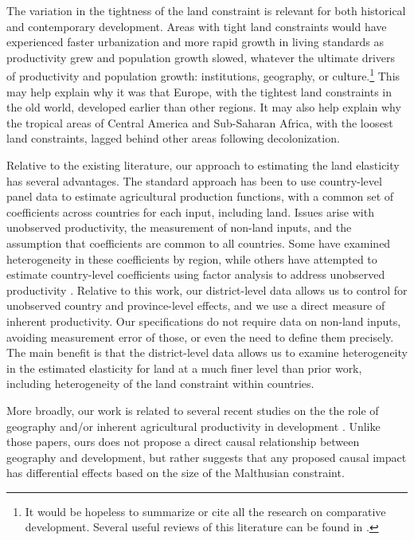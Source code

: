 \documentclass[11pt]{article}
\begin{document}
The variation in the tightness of the land constraint is relevant for both historical and contemporary development. Areas with tight land constraints would have experienced faster urbanization and more rapid growth in living standards as productivity grew and population growth slowed, whatever the ultimate drivers of productivity and population growth: institutions, geography, or culture.\footnote{It would be hopeless to summarize or cite all the research on comparative development. Several useful reviews of this literature can be found in \cite{ajr2005handbook,nunn_2009,Galor:2011uq,sw2013,vries2013}.} This may help explain why it was that Europe, with the tightest land constraints in the old world, developed earlier than other regions. It may also help explain why the tropical areas of Central America and Sub-Saharan Africa, with the loosest land constraints, lagged behind other areas following decolonization.

Relative to the existing literature, our approach to estimating the land elasticity has several advantages. The standard approach has been to use country-level panel data \citep{Hayami:1970ly,Hayami:1985cr,cpr1997,mm2001,Mundlak:2000dq,mbl2012,et2013mango} to estimate agricultural production functions, with a common set of coefficients across countries for each input, including land. Issues arise with unobserved productivity, the measurement of non-land inputs, and the assumption that coefficients are common to all countries. Some have examined heterogeneity in these coefficients \citep{gg2003,Wiebe2003Resource-Qualit} by region, while others have attempted to estimate country-level coefficients using factor analysis to address unobserved productivity \citep{et2013mango,ev2016clim}. Relative to this work, our district-level data allows us to control for unobserved country and province-level effects, and we use a direct measure of inherent productivity. Our specifications do not require data on non-land inputs, avoiding measurement error of those, or even the need to define them precisely. The main benefit is that the district-level data allows us to examine heterogeneity in the estimated elasticity for land at a much finer level than prior work, including heterogeneity of the land constraint within countries. 

More broadly, our work is related to several recent studies on the the role of geography and/or inherent agricultural productivity in development \citep{oh2005,ashraf2010dynamics,Nunn2011,Nunn2012,mich2012,agn2013,cook2014role,cook14,fenske2014,alsan2015,ashrafmich2015,dks2015,galorozak2016,litina2016,ads2016,FrankemaPap2017}. Unlike those papers, ours does not propose a direct causal relationship between geography and development, but rather suggests that any proposed causal impact has differential effects based on the size of the Malthusian constraint. 
\end{document}
